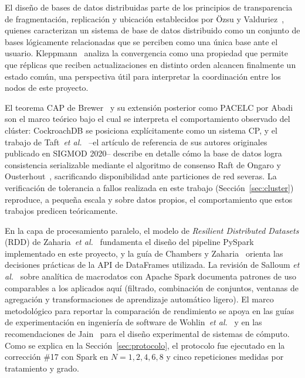 \documentclass[10pt,twocolumn]{article}
\begin{document}
El diseño de bases de datos distribuidas parte de los principios de
transparencia de fragmentación, replicación y ubicación establecidos por
Özsu y Valduriez~\cite{ozsu2020}, quienes caracterizan un sistema de base de
datos distribuido como un conjunto de bases lógicamente relacionadas que se
perciben como una única base ante el usuario. Kleppmann~\cite{kleppmann2022}
analiza la convergencia como una propiedad que permite que réplicas que
reciben actualizaciones en distinto orden alcancen finalmente un estado común,
una perspectiva útil para interpretar la coordinación entre los nodos de este
proyecto.

El teorema CAP de Brewer~\cite{brewer2012cap} y su extensión posterior como
PACELC por Abadi~\cite{abadi2012pacelc} son el marco teórico bajo el cual se
interpreta el comportamiento observado del clúster: CockroachDB se posiciona
explícitamente como un sistema CP, y el trabajo de
Taft~\emph{et al.}~\cite{taft2020} --el artículo de referencia de sus
autores originales publicado en SIGMOD 2020-- describe en detalle cómo la
base de datos logra consistencia serializable mediante el algoritmo de
consenso Raft de Ongaro y Ousterhout~\cite{ongaro2014raft}, sacrificando
disponibilidad ante particiones de red severas. La verificación de
tolerancia a fallos realizada en este trabajo (Sección~\ref{sec:cluster})
reproduce, a pequeña escala y sobre datos propios, el comportamiento que
estos trabajos predicen teóricamente.

En la capa de procesamiento paralelo, el modelo de \emph{Resilient
Distributed Datasets} (RDD) de Zaharia~\emph{et al.}~\cite{zaharia2012rdd}
fundamenta el diseño del pipeline PySpark implementado en este proyecto, y
la guía de Chambers y Zaharia~\cite{chambers2018spark} orienta las decisiones
prácticas de la API de DataFrames utilizada. La revisión de Salloum
\emph{et al.}~\cite{salloum2016spark} sobre analítica de macrodatos con Apache
Spark documenta patrones de uso comparables a los aplicados aquí (filtrado,
combinación de conjuntos, ventanas de agregación y transformaciones de
aprendizaje automático ligero). El marco metodológico para reportar la
comparación de rendimiento se apoya en las guías de experimentación en
ingeniería de software de Wohlin~\emph{et al.}~\cite{wohlin2012experimentation} y en las
recomendaciones de Jain~\cite{jain1991performance} para el diseño experimental de
sistemas de cómputo. Como se explica en la Sección~\ref{sec:protocolo}, el protocolo fue
ejecutado en la corrección \#17 con Spark en $N=1,2,4,6,8$ y cinco
repeticiones medidas por tratamiento y grado.
\end{document}
